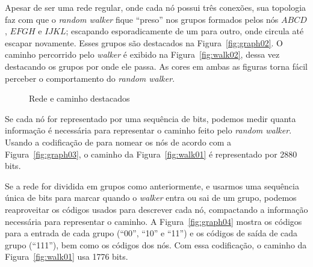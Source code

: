 \documentclass[
  article,
  11pt,
  a4paper,
  english,
  brazil,
  sumario=tradicional]{abntex2}
\begin{document}
Apesar de ser uma rede regular, onde cada nó possui três conexões, sua topologia faz com que o \textit{random walker} fique \enquote{preso} nos grupos formados pelos nós $ABCD$, $EFGH$ e $IJKL$; escapando esporadicamente de um para outro, onde circula até escapar novamente. Esses grupos são destacados na Figura~\ref{fig:graph02}. O caminho percorrido pelo \textit{walker} é exibido na Figura~\ref{fig:walk02}, dessa vez destacando os grupos por onde ele passa. As cores em ambas as figuras torna fácil perceber o comportamento do \textit{random walker}.

\begin{figure}[ht]
  \centering
  \caption{Rede e caminho destacados}
\end{figure}

Se cada nó for representado por uma sequência de bits, podemos medir quanta informação é necessária para representar o caminho feito pelo \textit{random walker}. Usando a codificação de  para nomear os nós de acordo com a Figura~\ref{fig:graph03}, o caminho da Figura~\ref{fig:walk01} é representado por 2880 bits.

Se a rede for dividida em grupos como anteriormente, e usarmos uma sequência única de bits para marcar quando o \textit{walker} entra ou sai de um grupo, podemos reaproveitar os códigos usados para descrever cada nó, compactando a informação necessária para representar o caminho. A Figura~\ref{fig:graph04} mostra os códigos para a entrada de cada grupo (\enquote{00}, \enquote{10} e \enquote{11}) e os códigos de saída de cada grupo (\enquote{111}), bem como os códigos dos nós. Com essa codificação, o caminho da Figura~\ref{fig:walk01} usa 1776 bits.
\end{document}
